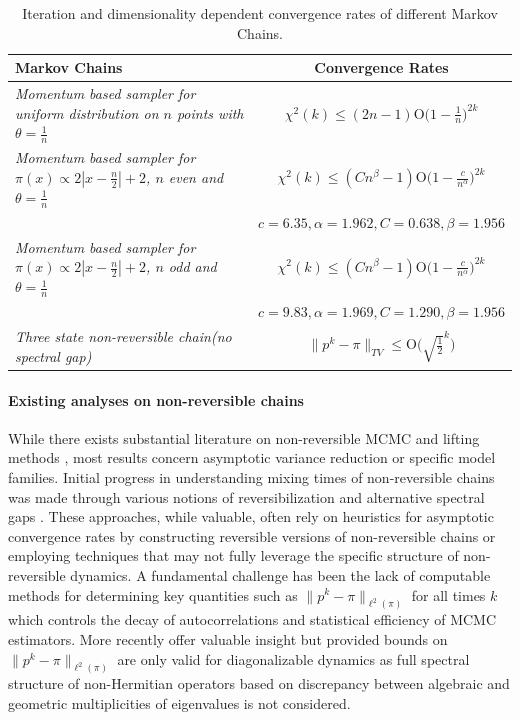 \documentclass[preprint]{imsart}
\theoremstyle{plain}
\theoremstyle{definition}
\begin{document}
\begin{table}[H]
\centering
\begin{tabular}{|l|c|}
\hline
\textbf{Markov Chains} & \textbf{Convergence Rates} \\ 
\hline
\textit{Momentum based sampler for uniform distribution on $n$ points with $\theta=\frac{1}{n}$} & $\chi^{2}(k) \leq (2n-1)\mathrm{O}\Big(1-\frac{1}{n}\Big)^{2k}$ \\ 
\hline
\textit{Momentum based sampler for $\pi(x)\propto 2|x-\frac{n}{2}|+2$, $n$ even and $\theta=\frac{1}{n}$ } & $\chi^{2}(k) \leq (Cn^{\beta}-1) \mathrm{O}\Big(1-\frac{c}{n^{\alpha}}\Big)^{2k}$ \\ & $c=6.35,\alpha=1.962, C=0.638,\beta=1.956$ \\ 
\hline
\textit{Momentum based sampler for $\pi(x)\propto 2|x-\frac{n}{2}|+2$, $n$ odd and $\theta=\frac{1}{n}$ } & $\chi^{2}(k) \leq (Cn^{\beta}-1)\mathrm{O}\Big(1-\frac{c}{n^{\alpha}}\Big)^{2k}$ \\ & $c=9.83,\alpha=1.969,C=1.290,\beta=1.956$ \\ 
\hline
\textit{Three state non-reversible chain(no spectral gap)} & $\|p^{k}-\pi\|_{TV} \leq \mathrm{O}\Big(\sqrt{\tfrac{1}{2}}^{k}\Big)$ \\ 
\hline
\end{tabular}
\caption{Iteration and dimensionality dependent convergence rates of different Markov Chains.}
\label{tab:asymp_conv_rates}
\end{table}

\paragraph{Existing analyses on non-reversible chains}
While there exists substantial literature on non-reversible MCMC and lifting methods 
\cite{Neal2004,Vucelja2014}, 
most results concern asymptotic variance reduction or specific model families. Initial progress in understanding mixing times of non-reversible chains was made through various notions of reversibilization and alternative spectral gaps \citep{choi2017analysis, fill1991eigenvalue, paulin2015concentration,HuangMao2017}. These approaches, while valuable, often rely on heuristics for asymptotic convergence rates by constructing reversible versions of non-reversible chains or employing techniques that may not fully leverage the specific structure of non-reversible dynamics. A fundamental challenge has been the lack of computable methods for determining key quantities such as $\|p^k - \pi\|_{\ell^2(\pi)}$ for all times $k$ which controls the decay of autocorrelations and statistical efficiency of MCMC estimators. More recently \citep{ChoiPatie2020} offer valuable insight but provided bounds on $\|p^k - \pi\|_{\ell^2(\pi)}$ are only valid for diagonalizable dynamics as full spectral structure of non-Hermitian operators based on discrepancy between algebraic and geometric multiplicities of eigenvalues is not considered.
\end{document}
